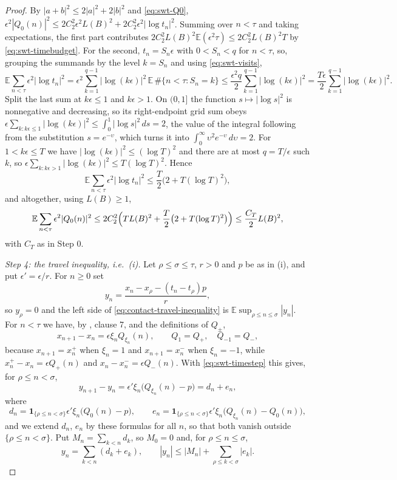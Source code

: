 \begin{proof}
By $|a+b|^2\le2|a|^2+2|b|^2$ and \eqref{eq:swt-Q0},
$\epsilon^2|Q_0(n)|^2\le2C_2^2\epsilon^2L(B)^2+2C_2^2\epsilon^2|\log t_n|^2$.
Summing over $n<\tau$ and taking expectations, the first part contributes
$2C_2^2L(B)^2\mathbb E(\epsilon^2\tau)\le2C_2^2L(B)^2T$ by
\eqref{eq:swt-timebudget}. For the second, $t_n=S_n\epsilon$ with $0<S_n<q$ for
$n<\tau$, so, grouping the summands by the level $k=S_n$ and using
\eqref{eq:swt-visits},
\[
  \mathbb E\sum_{n<\tau}\epsilon^2|\log t_n|^2
   =\epsilon^2\sum_{k=1}^{q-1}|\log(k\epsilon)|^2\,
      \mathbb E\,\#\{n<\tau:S_n=k\}
   \le\frac{\epsilon^2q}{2}\sum_{k=1}^{q-1}|\log(k\epsilon)|^2
   =\frac{T\epsilon}{2}\sum_{k=1}^{q-1}|\log(k\epsilon)|^2 .
\]
Split the last sum at $k\epsilon\le1$ and $k\epsilon>1$. On $(0,1]$ the function
$s\mapsto|\log s|^2$ is nonnegative and decreasing, so its right-endpoint grid
sum obeys
$\epsilon\sum_{k:k\epsilon\le1}|\log(k\epsilon)|^2\le\int_0^1|\log s|^2\,ds=2$,
the value of the integral following from the substitution $s=e^{-\upsilon}$,
which turns it into $\int_0^\infty\upsilon^2e^{-\upsilon}\,d\upsilon=2$. For
$1<k\epsilon\le T$ we have $|\log(k\epsilon)|^2\le(\log T)^2$ and there are at
most $q=T/\epsilon$ such $k$, so
$\epsilon\sum_{k:k\epsilon>1}|\log(k\epsilon)|^2\le T(\log T)^2$. Hence
\[
  \mathbb E\sum_{n<\tau}\epsilon^2|\log t_n|^2
   \le\frac T2\bigl(2+T(\log T)^2\bigr),
\]
and altogether, using $L(B)\ge1$,
\begin{equation}\label{eq:contact-velocity-budget}
  \mathbb E\sum_{n<\tau}\epsilon^2|Q_0(n)|^2
   \le2C_2^2\Bigl(TL(B)^2+\frac T2\bigl(2+T(\log T)^2\bigr)\Bigr)
   \le\frac{C_T}{2}L(B)^2 ,
\end{equation}
with $C_T$ as in Step 0.

\emph{Step 4: the travel inequality, i.e.\ (i).}
Let $\rho\le\sigma\le\tau$, $r>0$ and $p$ be as in (i), and put
$\epsilon'=\epsilon/r$. For $n\ge0$ set
\[
  y_n=\frac{x_n-x_\rho-(t_n-t_\rho)p}{r},
\]
so $y_\rho=0$ and the left side of \eqref{eq:contact-travel-inequality} is
$\mathbb E\sup_{\rho\le n\le\sigma}|y_n|$. For $n<\tau$ we have, by
, clause 7, and the definitions of $Q_\pm$,
\[
  x_{n+1}-x_n=\epsilon\xi_nQ_{\xi_n}(n),\qquad
  Q_{1}=Q_+,\quad Q_{-1}=Q_-,
\]
because $x_{n+1}=x^+_n$ when $\xi_n=1$ and $x_{n+1}=x^-_n$ when $\xi_n=-1$,
while $x^+_n-x_n=\epsilon Q_+(n)$ and $x_n-x^-_n=\epsilon Q_-(n)$. With
\eqref{eq:swt-timestep} this gives, for $\rho\le n<\sigma$,
\[
  y_{n+1}-y_n=\epsilon'\xi_n\bigl(Q_{\xi_n}(n)-p\bigr)=d_n+e_n,
\]
where
\[
  d_n=\mathbf1_{\{\rho\le n<\sigma\}}\epsilon'\xi_n\bigl(Q_0(n)-p\bigr),\qquad
  e_n=\mathbf1_{\{\rho\le n<\sigma\}}\epsilon'\xi_n
        \bigl(Q_{\xi_n}(n)-Q_0(n)\bigr),
\]
and we extend $d_n$, $e_n$ by these formulas for all $n$, so that both vanish
outside $\{\rho\le n<\sigma\}$. Put $M_n=\sum_{k<n}d_k$, so $M_0=0$ and, for
$\rho\le n\le\sigma$,
\begin{equation}\label{eq:swt-split}
  y_n=\sum_{k<n}(d_k+e_k),\qquad
  |y_n|\le|M_n|+\sum_{\rho\le k<\sigma}|e_k| .
\end{equation}


\end{proof}
